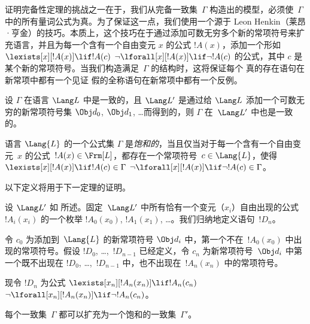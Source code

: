 \documentclass[../../../include/open-logic-section]{subfiles}
\begin{document}


\begin{explain}
证明完备性定理的挑战之一在于，我们从完备一致集~$\Gamma$ 构造出的模型，必须使~$\Gamma$ 中的所有量词公式为真。为了保证这一点，我们使用一个源于 Leon Henkin（莱昂·亨金）的技巧。本质上，这个技巧在于通过添加可数无穷多个新的常项符号来扩充语言，并且为每一个含有一个自由变元 $x$ 的公式 $!A(x)$，添加一个形如
      {$\lexists[x][!A(x)] \lif !A(c)$}
      {$\lnot\lforall[x][!A(x)] \lif \lnot !A(c)$}
的公式，其中 $c$ 是某个新的常项符号。当我们构造满足~$\Gamma$ 的结构时，这将保证每个
{真的存在语句在新常项中都有一个见证}
{假的全称语句在新常项中都有一个反例}。
\end{explain}

\begin{prop}
设 $\Gamma$ 在语言 $\Lang L$ 中是一致的，且 $\Lang L'$ 是通过给 $\Lang L$ 添加一个可数无穷的新常项符号集 $\Obj d_0$,
$\Obj d_1$, \dots 而得到的，则 $\Gamma$ 在~$\Lang L'$ 中也是一致的。
\end{prop}

\begin{defn}[饱和集]
语言 $\Lang{L}$ 的一个公式集 $\Gamma$ 是\emph{饱和的}，当且仅当对于每一个含有一个自由变元~$x$ 的公式~$!A(x) \in \Frm[L]$，都存在一个常项符号~$c \in \Lang{L}$，使得
      {$\lexists[x][!A(x)] \lif !A(c) \in \Gamma$}
      {$\lnot\lforall[x][!A(x)] \lif \lnot !A(c) \in \Gamma$}。
\end{defn}

以下定义将用于下一定理的证明。

\begin{defn}
设 $\Lang L'$ 如  所述。固定~$\Lang L'$ 中所有恰有一个变元（$x_i$）自由出现的公式~$!A_i(x_i)$ 的一个枚举 $!A_0(x_0)$, $!A_1(x_1)$, \dots。我们归纳地定义语句~$!D_n$。

令 $c_0$ 为添加到~$\Lang{L}$ 的新常项符号 $\Obj d_i$ 中，第一个不在~$!A_0(x_0)$ 中出现的常项符号。假设 $!D_0$, \dots,~$!D_{n-1}$ 已经定义，令 $c_n$ 为新常项符号~$\Obj d_i$ 中第一个既不出现在 $!D_0$, \dots,~$!D_{n-1}$ 中，也不出现在~$!A_n(x_n)$ 中的常项符号。

现令 $!D_{n}$ 为公式 
{$\lexists[x_{n}][!A_{n}(x_{n})] \lif
  !A_{n}(c_{n})$}{$\lnot\lforall[x_{n}][!A_{n}(x_{n})] \lif \lnot
  !A_{n}(c_{n})$}。
\end{defn}

\begin{lem}
每个一致集~$\Gamma$ 都可以扩充为一个饱和的一致集~$\Gamma'$。
\end{lem}
\end{document}
